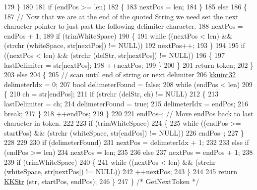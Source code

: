 \begin{DoxyCode}
179     \}
180 
181     \textcolor{keywordflow}{if}  (endPos >= len)
182     \{
183       nextPos = len;
184     \}
185     \textcolor{keywordflow}{else}
186     \{
187       \textcolor{comment}{// Now that we are at the end of the quoted String we need set the next character pointer to just
       past the following delimiter character.}
188       nextPos = endPos + 1;
189       \textcolor{keywordflow}{if}  (trimWhiteSpace)
190       \{
191         \textcolor{keywordflow}{while}  ((nextPos < len)  &&  (strchr (whiteSpace, str[nextPos]) != NULL))
192           nextPos++;
193       \}
194 
195       \textcolor{keywordflow}{if}  ((nextPos < len)  &&  (strchr (delStr, str[nextPos]) != NULL))
196       \{
197         lastDelimiter =  str[nextPos];
198         ++nextPos;
199       \}
200     \}  
201     \textcolor{keywordflow}{return}  token;
202   \}
203   \textcolor{keywordflow}{else}
204   \{
205     \textcolor{comment}{// scan until end of string or next delimiter}
206     \hyperlink{namespace_k_k_b_af8d832f05c54994a1cce25bd5743e19a}{kkuint32}  delimeterIdx = 0;
207     \textcolor{keywordtype}{bool}      delimeterFound = \textcolor{keyword}{false};
208     \textcolor{keywordflow}{while}  (endPos < len)
209     \{
210       ch = str[endPos];
211       \textcolor{keywordflow}{if}  (strchr (delStr, ch) != NULL)
212       \{
213         lastDelimiter = ch;
214         delimeterFound = \textcolor{keyword}{true};
215         delimeterIdx = endPos;
216         \textcolor{keywordflow}{break};
217       \}
218       ++endPos;
219     \}
220 
221     endPos--;  \textcolor{comment}{// Move endPos back to last character in token.}
222 
223     \textcolor{keywordflow}{if}  (trimWhiteSpace)
224     \{
225       \textcolor{keywordflow}{while}  ((endPos >= startPos)  &&  (strchr (whiteSpace, str[endPos]) != NULL))
226         endPos--;
227     \}
228 
229 
230     \textcolor{keywordflow}{if}  (delimeterFound)
231       nextPos = delimeterIdx + 1;
232 
233     \textcolor{keywordflow}{else} \textcolor{keywordflow}{if}  (endPos >= len)
234       nextPos = len;
235 
236     \textcolor{keywordflow}{else}
237       nextPos = endPos + 1;
238 
239     \textcolor{keywordflow}{if}  (trimWhiteSpace)
240     \{
241       \textcolor{keywordflow}{while}  ((nextPos < len)  &&  (strchr (whiteSpace, str[nextPos]) != NULL))
242         ++nextPos;
243     \}
244 
245     \textcolor{keywordflow}{return} \hyperlink{class_k_k_b_1_1_k_k_str}{KKStr} (str, startPos, endPos);
246   \}
247 \}  \textcolor{comment}{/* GetNextToken */}
\end{DoxyCode}
